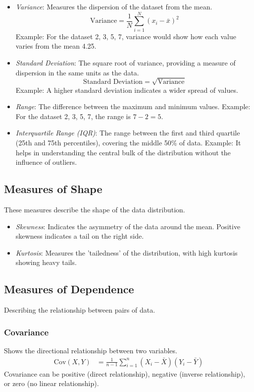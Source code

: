 \documentclass{article}
\theoremstyle{definition}
\theoremstyle{theorem}
\theoremstyle{theorem}
\theoremstyle{theorem}
\theoremstyle{theorem}
\theoremstyle{definition}
\theoremstyle{definition}
\theoremstyle{definition}
\theoremstyle{definition}
\theoremstyle{definition}
\begin{document}
\begin{itemize}
    \item \textit{Variance}: Measures the dispersion of the dataset from the mean.
    \[
    \text{Variance} = \frac{1}{N} \sum_{i=1}^{N} (x_i - \bar{x})^2
    \]
    Example: For the dataset 2, 3, 5, 7, variance would show how each value varies from the mean 4.25.

    \item \textit{Standard Deviation}: The square root of variance, providing a measure of dispersion in the same units as the data.
    \[
    \text{Standard Deviation} = \sqrt{\text{Variance}}
    \]
    Example: A higher standard deviation indicates a wider spread of values.

    \item \textit{Range}: The difference between the maximum and minimum values.
    Example: For the dataset 2, 3, 5, 7, the range is \(7-2=5\).

    \item \textit{Interquartile Range (IQR)}: The range between the first and third quartile (25th and 75th percentiles), covering the middle 50\% of data.
    Example: It helps in understanding the central bulk of the distribution without the influence of outliers.
\end{itemize}

\subsection{Measures of Shape}

These measures describe the shape of the data distribution.

\begin{itemize}
    \item \textit{Skewness}: Indicates the asymmetry of the data around the mean. Positive skewness indicates a tail on the right side.
    \item \textit{Kurtosis}: Measures the 'tailedness' of the distribution, with high kurtosis showing heavy tails.
\end{itemize}

\subsection{Measures of Dependence}

Describing the relationship between pairs of data.

\subsubsection*{Covariance}
Shows the directional relationship between two variables.
\begin{align*}
    \text{Cov}(X, Y) &= \frac{1}{n-1} \sum_{i=1}^{n} (X_i - \bar{X})(Y_i - \bar{Y})
\end{align*}
Covariance can be positive (direct relationship), negative (inverse relationship), or zero (no linear relationship).
\end{document}
